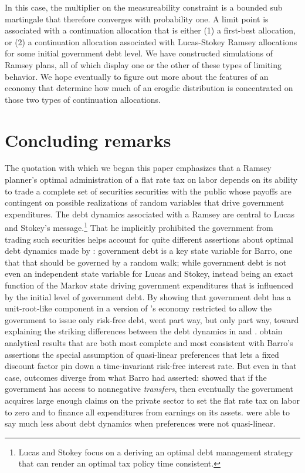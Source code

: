 \documentclass[12pt]{article}
\begin{document}
In this case, the multiplier on the measureability constraint is a bounded sub martingale that therefore converges with probability one.  
A limit point is associated with a continuation allocation that is either (1) a first-best allocation, or (2) a
 continuation allocation associated with Lucas-Stokey Ramsey allocations
for some initial government debt level. We have constructed simulations  of Ramsey plans, all of which display one or the other of these types of limiting behavior.
We hope eventually  to figure out more about the features of an economy that determine how much of 
an erogdic distribution is concentrated on those two types of continuation allocations. 



\section{Concluding remarks}

The  \citet{LucasJr.1983} quotation  with which we began this paper emphasizes that a Ramsey planner's optimal administration of a flat rate
tax on labor depends on its ability to trade a complete set of securities securities with the public whose payoffs are contingent on 
possible realizations of random variables that drive
government expenditures.  The 
debt dynamics associated with a Ramsey are central to Lucas and Stokey's message.\footnote{Lucas and Stokey focus on  a deriving an optimal debt management strategy that can render an optimal tax policy time consistent.}  That he implicitly prohibited the government from trading such securities helps account for quite different
assertions about optimal debt dynamics made by \citet{Barro1979}: government debt is a key state variable for Barro, one that that should be governed by
a random walk; while government debt is not even an independent state variable for Lucas and Stokey, instead being an exact function of the Markov state driving 
government expenditures that is influenced by the initial level of government debt.  By showing that government debt has a unit-root-like component
in a version 
of \citeauthor{LucasJr.1983}'s economy restricted to allow the government to issue only risk-free debt, \citet{Aiyagari2002} went part way, but only part way,
toward explaining  the striking differences between the debt dynamics  in \citeauthor{LucasJr.1983} and  \citeauthor{Barro1979}.  
 \citeauthor{Aiyagari2002} obtain analytical results that are both most   complete and most consistent with Barro's assertions
  the special assumption of   quasi-linear preferences that lets  a fixed discount factor pin down a time-invariant  risk-free interest rate.
  But even in that case, outcomes diverge from what Barro had asserted: \citeauthor{Aiyagari2002} showed that if the government has access to 
  nonnegative {\em transfers}, then eventually the government acquires large enough claims on the private sector to set the flat rate tax on labor to zero
  and to finance all expenditures from earnings on its assets.  \citeauthor{Aiyagari2002} were able to say much less about debt dynamics when preferences were
  not quasi-linear.  
  
\end{document}
